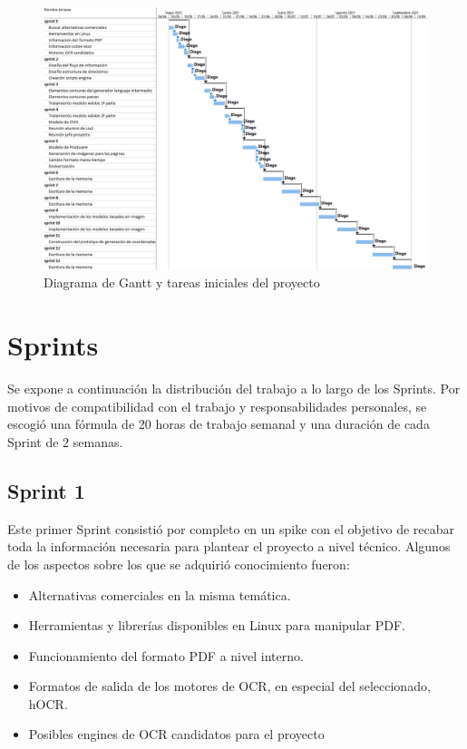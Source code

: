 \begin{figure}[hp!]
    \centering
    \includegraphics[angle=90,width=1.0\textwidth]{imaxes/f-planificacion/gantt-inicial.png}
    \caption{Diagrama de Gantt y tareas iniciales del proyecto}
    \label{fig:gantt-inicial}
\end{figure}

\section{Sprints}

Se expone a continuación la distribución del trabajo a lo largo de los Sprints. Por motivos de compatibilidad con el trabajo y responsabilidades personales, se escogió una fórmula de 20 horas de trabajo semanal y una duración de cada Sprint de 2 semanas.

\subsection{Sprint 1}

Este primer Sprint consistió por completo en un spike con el objetivo de recabar toda la información necesaria para plantear el proyecto a nivel técnico. Algunos de los aspectos sobre los que se adquirió conocimiento fueron:

\begin{itemize}
    \item Alternativas comerciales en la misma temática.
    \item Herramientas y librerías disponibles en Linux para manipular PDF.
    \item Funcionamiento del formato PDF a nivel interno.
    \item Formatos de salida de los motores de OCR, en especial del seleccionado, hOCR.
    \item Posibles engines de OCR candidatos para el proyecto
\end{itemize}

